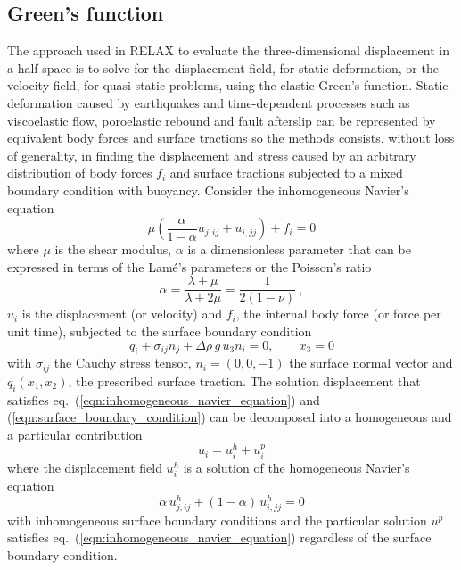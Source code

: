 \documentclass[10pt]{article}
\begin{document}
\subsection{Green's function}
The approach used in RELAX to evaluate the three-dimensional displacement in a half space is to solve for the displacement field, for static deformation, or the velocity field, for quasi-static problems, using the elastic Green's function. Static deformation caused by earthquakes and time-dependent processes such as viscoelastic flow, poroelastic rebound and fault afterslip can be represented by equivalent body forces and surface tractions so the methods consists, without loss of generality, in finding the displacement and stress caused by an arbitrary distribution of body forces $f_i$ and surface tractions subjected to a mixed boundary condition with buoyancy. Consider the inhomogeneous Navier's equation
%
\begin{equation}\label{eqn:inhomogeneous_navier_equation}
\mu\left(\frac{\alpha}{1-\alpha}u_{j,ij}+u_{i,jj}\right)+f_i=0
\end{equation}
%
where $\mu$ is the shear modulus, $\alpha$ is a dimensionless parameter that can be expressed in terms of the Lam\'{e}'s parameters or the Poisson's ratio
\begin{equation}
\alpha=\frac{\lambda+\mu}{\lambda+2\mu}=\frac{1}{2(1-\nu)}~,
\end{equation}
$u_i$ is the displacement (or velocity) and $f_i$, the internal body force (or force per unit time), subjected to the surface boundary condition
%
\begin{equation}\label{eqn:surface_boundary_condition}
q_i+\sigma_{ij}n_j+\Delta\rho\,g\,u_3 n_i=0,\qquad x_3=0
\end{equation}
%
with $\sigma_{ij}$ the Cauchy stress tensor, $n_i=(0,0,-1)$ the surface normal vector and $q_i(x_1,x_2)$, the prescribed surface traction. The solution displacement that satisfies eq.~(\ref{eqn:inhomogeneous_navier_equation}) and (\ref{eqn:surface_boundary_condition}) can be decomposed into a homogeneous and a particular contribution
\begin{equation}\label{eqn:decomposition_particular_general}
u_i=u_i^h+u_i^p
\end{equation}
where the displacement field $u_i^h$ is a solution of the homogeneous Navier's equation
%
\begin{equation}\label{eqn:homogeneous_navier}
\alpha\,u^h_{j,ij}+(1-\alpha)\,u^h_{i,jj}=0
\end{equation}
with inhomogeneous surface boundary conditions and the particular solution $u^p$ satisfies eq.~(\ref{eqn:inhomogeneous_navier_equation}) regardless of the surface boundary condition. 
\end{document}
